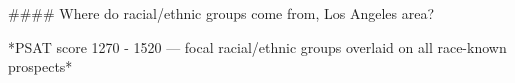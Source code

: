 #### Where do racial/ethnic groups come from, Los Angeles area?

*PSAT score 1270 - 1520 — focal racial/ethnic groups overlaid on all race-known prospects*
